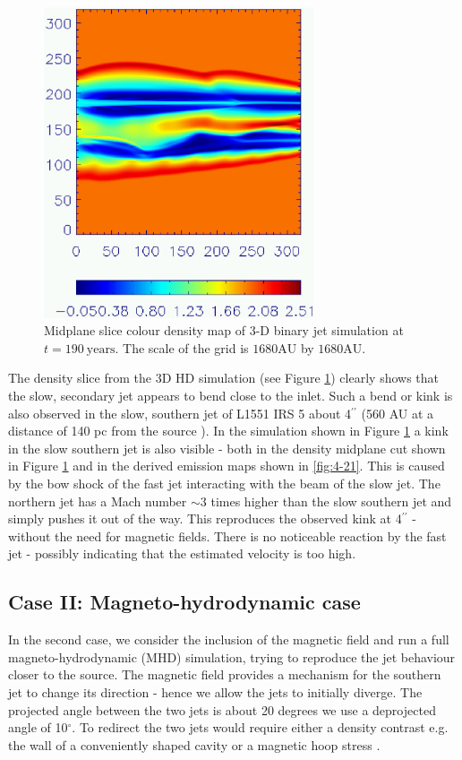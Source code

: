 \documentclass{aa}
\begin{document}
\begin{figure}[ht]
\centering
\includegraphics[width=8cm]{8609fig3.eps}
\caption{ 
Midplane slice colour density map of 3-D binary jet simulation at $t=190~\mathrm{years}$.
The scale of the grid is $1680 \mathrm{AU}$ by $1680 \mathrm{AU}$.
}
\label{fig:4-5} 
\end{figure}

The density slice from the 3D HD simulation (see Figure \ref{fig:4-5}) 
clearly shows that the slow, secondary jet appears to bend close to the inlet.
Such a bend or kink is also observed in the slow, southern jet of 
L1551 IRS 5 about 4$^{\prime\prime}$ (560 AU at a distance of 140 pc
from the source \citep{2000PASJ...52...81I}).
In the simulation shown in Figure \ref{fig:4-5} a kink in the slow southern jet
is also visible - both in the density midplane cut shown in Figure \ref{fig:4-5}
and in the derived emission maps shown in \ref{fig:4-21}. This is caused by 
the bow shock of the fast jet interacting with the beam of the slow jet.
The northern jet has a Mach number $\sim 3$ times higher
than the slow southern jet and simply pushes it out of the way. This
reproduces the observed kink at 4$^{\prime\prime}$ - without the need for magnetic
fields. There is no noticeable reaction by the fast jet - possibly
indicating that the estimated velocity is too high.


\subsection{Case II: Magneto-hydrodynamic case}
\label{MHDjet}

In the second case, we consider the inclusion of the magnetic field 
and run a full magneto-hydrodynamic (MHD) simulation, trying
to reproduce the jet behaviour closer to the source.
The magnetic field provides a mechanism for the southern jet to change its
direction - hence we allow the jets to initially diverge.
The projected angle between the two jets is about 20 degrees
\citep{1998ApJ...499L..75F}
we use a deprojected angle of 10$^\circ$.
To 
redirect the two jets would require either a 
density contrast e.g. the wall of a conveniently shaped cavity 
or a magnetic hoop stress \citep{2003ApJ...584..843B}.
\end{document}
